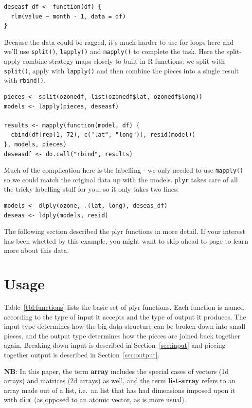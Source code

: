 \documentclass[letterpage]{scrartcl}
\newcommand{\code}[1]{\lstinline!#1!}
\newcommand{\f}[1]{\lstinline!#1()!}
\newcommand{\plyr}{{\tt plyr}\xspace}
\begin{document}
\begin{verbatim}
deseasf_df <- function(df) {
  rlm(value ~ month - 1, data = df)
}
\end{verbatim}

Because the data could be ragged, it's much harder to use for loops here and  we'll use \f{split}, \f{lapply} and \f{mapply} to complete the task.  Here the split-apply-combine strategy maps closely to built-in R functions: we split with \f{split}, apply with \f{lapply} and then combine the pieces into a single result with \f{rbind}.

\begin{verbatim}
pieces <- split(ozonedf, list(ozonedf$lat, ozonedf$long))
models <- lapply(pieces, deseasf)

results <- mapply(function(model, df) {
  cbind(df[rep(1, 72), c("lat", "long")], resid(model))
}, models, pieces)
deseasdf <- do.call("rbind", results)
\end{verbatim}

Much of the complication here is the labelling - we only needed to use \f{mapply} so we could match the original data up with the models. \plyr takes care of all the tricky labelling stuff for you, so it only takes two lines:

\begin{verbatim}
models <- dlply(ozone, .(lat, long), deseas_df)
deseas <- ldply(models, resid)
\end{verbatim}

The following section described the plyr functions in more detail.  If your interest has been whetted by this example, you might want to skip ahead to page \pageref{sub:ozone} to learn more about this data.

\section{Usage}
\label{sec:usage}

Table~\ref{tbl:functions} lists the basic set of plyr functions.  Each function is named according to the type of input it accepts and the type of output it produces.  The input type determines how the big data structure can be broken down into small pieces, and the output type determines how the pieces are joined back together again.  Breaking down input is described in Section~\ref{sec:input} and piecing together output is described in Section~\ref{sec:output}.

{\bf NB}: In this paper, the term {\bf array} includes the special cases of vectors (1d arrays) and matrices (2d arrays) as well, and the term {\bf list-array} refers to an array made out of a list, i.e.\ an list that has had dimensions imposed upon it with \code{dim}.   (as opposed to an atomic vector, as is more usual).
\end{document}

